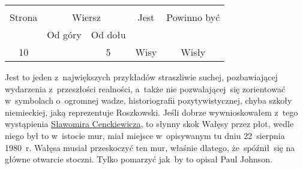 \documentclass[a4paper,11pt]{article}
\begin{document}
\vspace{\spaceTwo}



















\begin{center}

  \begin{tabular}{|c|c|c|c|c|}
    \hline
    & \multicolumn{2}{c|}{} & & \\
    Strona & \multicolumn{2}{c|}{Wiersz} & Jest
                              & Powinno być \\ \cline{2-3}
    & Od góry & Od dołu & & \\
    \hline
    10 & & 5 & Wisy & Wisły \\
    \hline
  \end{tabular}

\end{center}

\vspace{\spaceTwo}










\start {} Jest to jeden z~największych przykładów straszliwie
suchej, pozbawiającej wydarzenia z~przeszłości realności, a~także nie
pozwalającej~się zorientować w~symbolach o~ogromnej wadze,
historiografii pozytywistycznej, chyba szkoły niemieckiej, jaką
reprezentuje Roszkowski. Jeśli dobrze wywnioskowałem z~tego
wystąpienia
\href{https://www.youtube.com/watch?v=6B93_3CCMac}{Sławomira
  Cenckiewicza}, to słynny skok Wałęsy przez płot, wedle niego był to
w~istocie mur, miał miejsce w~opisywanym tu dniu 22~sierpnia 1980~r.
Wałęsa musiał przeskoczyć ten mur, właśnie dlatego, że~spóźnił~się na
główne otwarcie stoczni. Tylko pomarzyć jak~by to opisał Paul Johnson.
\end{document}
